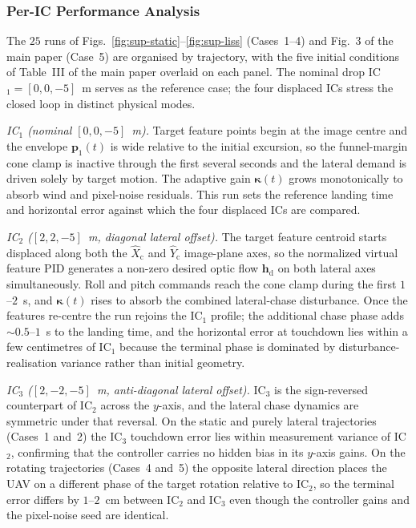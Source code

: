 \documentclass[10pt,journal]{IEEEtran}
\begin{document}
\subsubsection*{Per-IC Performance Analysis}

The $25$ runs of Figs.~\ref{fig:sup-static}--\ref{fig:sup-liss} (Cases~1--4) and Fig.~3 of the main paper (Case~5) are organised by trajectory, with the five initial conditions of Table~III of the main paper overlaid on each panel. The nominal drop IC$_1=[0,0,-5]$~m serves as the reference case; the four displaced ICs stress the closed loop in distinct physical modes.

\emph{IC$_1$ (nominal $[0,0,-5]$~m).} Target feature points begin at the image centre and the envelope $\boldsymbol{p}_1(t)$ is wide relative to the initial excursion, so the funnel-margin cone clamp is inactive through the first several seconds and the lateral demand is driven solely by target motion. The adaptive gain $\boldsymbol{\kappa}(t)$ grows monotonically to absorb wind and pixel-noise residuals. This run sets the reference landing time and horizontal error against which the four displaced ICs are compared.

\emph{IC$_2$ ($[2,2,-5]$~m, diagonal lateral offset).} The target feature centroid starts displaced along both the $\hat{X}_\text{c}$ and $\hat{Y}_\text{c}$ image-plane axes, so the normalized virtual feature PID generates a non-zero desired optic flow $\boldsymbol{h}_\text{d}$ on both lateral axes simultaneously. Roll and pitch commands reach the cone clamp during the first $1$--$2$~s, and $\boldsymbol{\kappa}(t)$ rises to absorb the combined lateral-chase disturbance. Once the features re-centre the run rejoins the IC$_1$ profile; the additional chase phase adds $\sim 0.5$--$1$~s to the landing time, and the horizontal error at touchdown lies within a few centimetres of IC$_1$ because the terminal phase is dominated by disturbance-realisation variance rather than initial geometry.

\emph{IC$_3$ ($[2,-2,-5]$~m, anti-diagonal lateral offset).} IC$_3$ is the sign-reversed counterpart of IC$_2$ across the $y$-axis, and the lateral chase dynamics are symmetric under that reversal. On the static and purely lateral trajectories (Cases~1 and~2) the IC$_3$ touchdown error lies within measurement variance of IC$_2$, confirming that the controller carries no hidden bias in its $y$-axis gains. On the rotating trajectories (Cases~4 and~5) the opposite lateral direction places the UAV on a different phase of the target rotation relative to IC$_2$, so the terminal error differs by $1$--$2$~cm between IC$_2$ and IC$_3$ even though the controller gains and the pixel-noise seed are identical.
\end{document}
